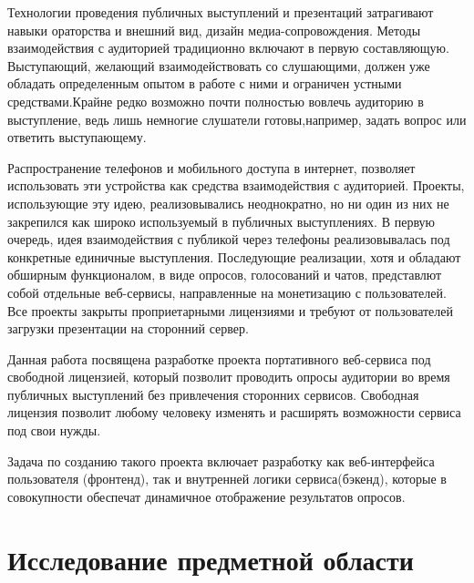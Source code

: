 







\Intro
Технологии проведения публичных выступлений и презентаций затрагивают навыки ораторства и внешний вид, дизайн медиа-сопровождения. Методы взаимодействия с аудиторией традиционно включают в первую составляющую. Выступающий, желающий взаимодействовать со слушающими, должен уже обладать определенным опытом в работе с ними и ограничен устными средствами.Крайне редко возможно почти полностью вовлечь аудиторию в выступление, ведь лишь немногие слушатели готовы,например, задать вопрос или ответить выступающему.


Распространение телефонов и мобильного доступа в интернет, позволяет использовать эти устройства как средства взаимодействия с аудиторией. Проекты, использующие эту идею, реализовывались неоднократно, но ни один из них не закрепился как широко используемый в публичных выступлениях. В первую очередь, идея взаимодействия с публикой через телефоны реализовывалась под конкретные единичные выступления. Последующие реализации, хотя и обладают обширным функционалом, в виде  опросов, голосований и чатов, представлют собой отдельные веб-сервисы, направленные на монетизацию с пользователей. Все проекты закрыты проприетарными лицензиями и требуют от пользователей загрузки презентации на сторонний сервер.

Данная работа посвящена разработке проекта портативного веб-сервиса под свободной лицензией, который позволит проводить опросы аудитории во время публичных выступлений без привлечения сторонних сервисов. Свободная лицензия позволит любому человеку изменять и расширять возможности сервиса под свои нужды.

Задача по созданию такого проекта включает разработку как веб-интерфейса пользователя (фронтенд), так и  внутренней логики сервиса(бэкенд), которые в совокупности обеспечат динамичное отображение результатов опросов.
   
\section{Исследование предметной области}
